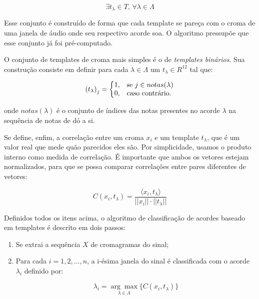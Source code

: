     \[
      \exists t_\lambda \in T \textrm{, } \forall \lambda \in \Lambda
    \]
    
    Esse conjunto é construído de forma que cada template se pareça com o croma de uma janela de áudio onde seu respectivo acorde soa. O algoritmo pressupõe que esse conjunto já foi pré-computado.
    
    O conjunto de templates de croma mais simples é o de \textit{templates binários}. Sua construção consiste em definir para cada $\lambda \in \Lambda$ um $t_\lambda \in R^{12}$ tal que:
    
    \[
        {(t_\lambda)}_j = \left\{
            \begin{array}{@{}ll@{}}
                1, & \textrm{se}\ j \in notas(\lambda) \\
                0, & \textrm{caso contrário.}
            \end{array}\right.
    \]
    
    onde $notas(\lambda)$ é o conjunto de índices das notas presentes no acorde $\lambda$ na sequência de notas de dó a si.
    
    Se define, enfim, a correlação entre um croma $x_i$ e um template $t_\lambda$, que é um valor real que mede quão parecidos eles são. Por simplicidade, usamos o produto interno como medida de correlação. É importante que ambos os vetores estejam normalizados, para que se possa comparar correlações entre pares diferentes de vetores:
    
    \[
        C(x_i, t_\lambda) =
            \frac{\langle x_i, t_\lambda \rangle}{||x_i|| \cdot ||t_\lambda||}
    \]
    
    Definidos todos os itens acima, o algoritmo de classificação de acordes baseado em templates é descrito em dois passos:

    \begin{enumerate}
        \item Se extrai a sequência $X$ de cromagramas do sinal;
        \item Para cada $i = 1, 2, \dots, n$, a i-ésima janela do sinal       é classificada com o acorde $\lambda_i$ definido por:
        
        \[
            \lambda_i = \underset{\lambda \in \Lambda}{\arg \max}\{C(x_i, t_\lambda)\}
        \]
        
    \end{enumerate}


